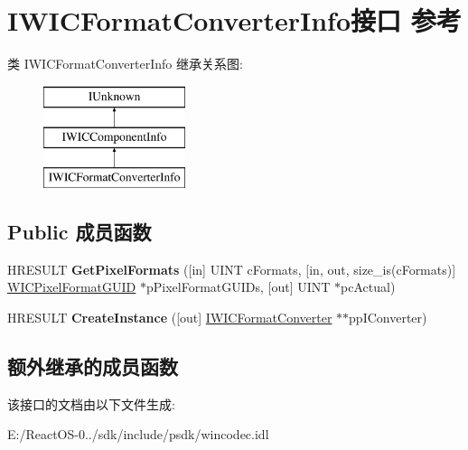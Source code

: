 \hypertarget{interface_i_w_i_c_format_converter_info}{}\section{I\+W\+I\+C\+Format\+Converter\+Info接口 参考}
\label{interface_i_w_i_c_format_converter_info}
类 I\+W\+I\+C\+Format\+Converter\+Info 继承关系图\+:\begin{figure}[H]
\begin{center}
\leavevmode
\includegraphics[height=3.000000cm]{interface_i_w_i_c_format_converter_info}
\end{center}
\end{figure}
\subsection*{Public 成员函数}
\begin{DoxyCompactItemize}
\item 
\mbox{\label{interface_i_w_i_c_format_converter_info_a3da0fb326cb0dc12d91ad35ec62171e5}} 
H\+R\+E\+S\+U\+LT {\bfseries Get\+Pixel\+Formats} (\mbox{[}in\mbox{]} U\+I\+NT c\+Formats, \mbox{[}in, out, size\+\_\+is(c\+Formats)\mbox{]} \hyperlink{interface_g_u_i_d}{W\+I\+C\+Pixel\+Format\+G\+U\+ID} $\ast$p\+Pixel\+Format\+G\+U\+I\+Ds, \mbox{[}out\mbox{]} U\+I\+NT $\ast$pc\+Actual)
\item 
\mbox{\label{interface_i_w_i_c_format_converter_info_ae6a4121f74418f4ec261175da86cebfc}} 
H\+R\+E\+S\+U\+LT {\bfseries Create\+Instance} (\mbox{[}out\mbox{]} \hyperlink{interface_i_w_i_c_format_converter}{I\+W\+I\+C\+Format\+Converter} $\ast$$\ast$pp\+I\+Converter)
\end{DoxyCompactItemize}
\subsection*{额外继承的成员函数}


该接口的文档由以下文件生成\+:\begin{DoxyCompactItemize}
\item 
E\+:/\+React\+O\+S-\/0../sdk/include/psdk/wincodec.\+idl\end{DoxyCompactItemize}
